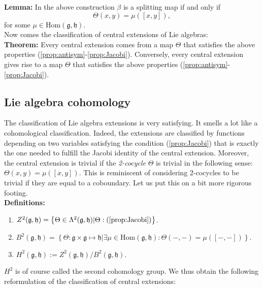 \documentclass[submission, PhysLectNotes]{SciPost}
\begin{document}
{\bf Lemma:} In the above construction $\beta$ is a splitting map if and only if
\begin{equation}
	\Theta(x,y) = \mu([x,y]),
\end{equation}
for some $\mu\in\text{Hom}(\mathfrak{g},\mathfrak{h})$.\\

Now comes the classification of central extensions of Lie algebras:\\

{\bf Theorem:} Every central extension comes from a map $\Theta$ that satisfies the above properties (\ref{prop:antisym}-\ref{prop:Jacobi}). Conversely, every central extension gives rise to a map $\Theta$ that satisfies the above properties (\ref{prop:antisym}-\ref{prop:Jacobi}).

\subsection{Lie algebra cohomology}
The classification of Lie algebra extensions is very satisfying. It smells a lot like a cohomological classification. Indeed, the extensions are classified by functions depending on two variables satisfying the condition (\ref{prop:Jacobi}) that is exactly the one needed to fulfill the Jacobi identity of the central extension. Moreover, the central extension is trivial if the \emph{2-cocycle} $\Theta$ is trivial in the following sense: $\Theta(x,y) = \mu([x,y])$. This is reminiscent of considering 2-cocycles to be trivial if they are equal to a coboundary. Let us put this on a bit more rigorous footing.\\

{\bf Definitions:}
\begin{enumerate}
	\item $Z^2(\mathfrak{g},\mathfrak{h}) = \left\{\Theta\in\Lambda^2(\mathfrak{g},\mathfrak{h})|\Theta:(\ref{prop:Jacobi})\right\}$.
	\item $B^2(\mathfrak{g},\mathfrak{h})=\left\{\Theta:\mathfrak{g}\times\mathfrak{g}\mapsto\mathfrak{h}|\exists\mu\in\text{Hom}(\mathfrak{g},\mathfrak{h}):\Theta(-,-)=\mu([-,-])\right\}$.
	\item $H^2(\mathfrak{g},\mathfrak{h}):=Z^2(\mathfrak{g},\mathfrak{h})/B^2(\mathfrak{g},\mathfrak{h})$.
\end{enumerate}
$H^2$ is of course called the second cohomology group. We thus obtain the following reformulation of the classification of central extensions:\\
\end{document}

